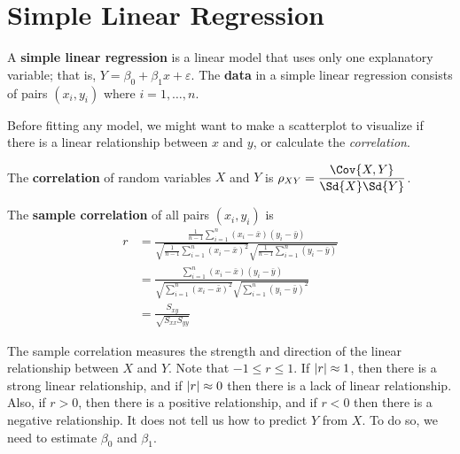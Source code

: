 \section{Simple Linear Regression}
\begin{definition}
    A \textbf{simple linear regression}
    is a linear model that uses only one
    explanatory variable; that is,
    $ Y=\beta_0+\beta_1x+\varepsilon $.
    The \textbf{data}
    in a simple linear regression consists of pairs $ (x_i,y_i) $
    where $ i=1,\ldots,n $.
\end{definition}
\begin{remark}
    Before fitting any model, we might want
    to make a scatterplot to visualize if there
    is a linear relationship between $ x $ and $ y $,
    or calculate the \emph{correlation}.
\end{remark}
\begin{definition}
    The \textbf{correlation} of
    random variables $ X $ and $ Y $ is
    $ \rho_{XY}=\dfrac{\Cov{X,Y}}{\Sd{X}\Sd{Y}} $.
\end{definition}
\begin{definition}
    The \textbf{sample correlation} of
    all pairs $ (x_i,y_i) $ is
    \begin{align*}
        r
         & =\frac{\frac{1}{n-1} \sum_{i=1}^{n}(x_i-\bar{x})(y_i-\bar{y})}
        {\sqrt{\frac{1}{n-1}\sum_{i=1}^{n} (x_i-\bar{x})^2}
            \sqrt{\frac{1}{n-1}\sum_{i=1}^{n}(y_i-\bar{y})}}              \\
         & =\frac{\sum_{i=1}^{n} (x_i-\bar{x})(y_i-\bar{y})}{
            \sqrt{\sum_{i=1}^{n} (x_i-\bar{x})^2}
            \sqrt{\sum_{i=1}^{n} (y_i-\bar{y})^2}
        }                                                                 \\
         & =\frac{S_{xy}}{\sqrt{S_{xx}S_{yy}}}
    \end{align*}
\end{definition}
\begin{remark}
    The sample correlation measures the strength and direction of
    the linear relationship between $ X $ and $ Y $. Note
    that $ -1\leqslant r\leqslant 1 $.
    If $ \lvert r\rvert\approx 1 $, then
    there is a strong linear relationship, and if
    $ \lvert r\rvert\approx 0 $
    then there is a lack of linear relationship. Also, if $ r>0 $,
    then there is a positive relationship, and if $ r<0 $
    then there is a negative relationship.
    It does not tell us how to predict $ Y $ from $ X $. To do so,
    we need to estimate $ \beta_0 $ and $ \beta_1 $.
\end{remark}

